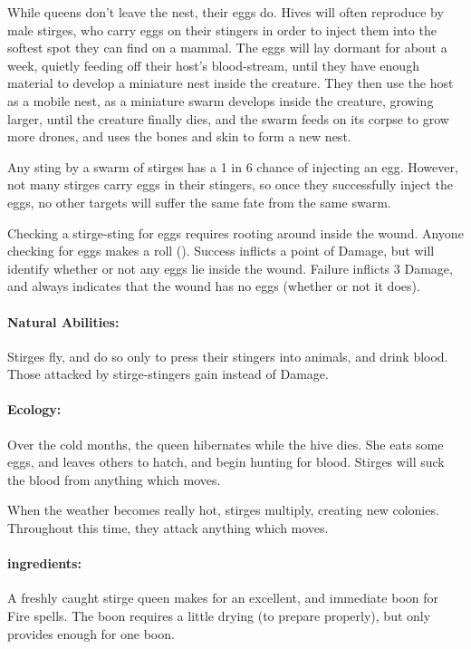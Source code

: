\begin{multicols}{2}
While queens don't leave the nest, their eggs do.
Hives will often reproduce by male stirges, who carry eggs on their stingers in order to inject them into the softest spot they can find on a mammal.
The eggs will lay dormant for about a week, quietly feeding off their host's blood-stream, until they have enough material to develop a miniature nest inside the creature.
They then use the host as a mobile nest, as a miniature swarm develops inside the creature, growing larger, until the creature finally dies, and the swarm feeds on its corpse to grow more drones, and uses the bones and skin to form a new nest.

Any sting by a swarm of stirges has a 1 in 6 chance of injecting an egg.
However, not many stirges carry eggs in their stingers, so once they successfully inject the eggs, no other targets will suffer the same fate from the same swarm.

Checking a stirge-sting for eggs requires rooting around inside the wound.
Anyone checking for eggs makes a  roll (\tn[12]).
Success inflicts a point of Damage, but will identify whether or not any eggs lie inside the wound.
Failure inflicts 3 Damage, and always indicates that the wound has no eggs (whether or not it does).

\paragraph{Natural Abilities:}
Stirges fly, and do so only to press their stingers into animals, and drink blood.
Those attacked by stirge-stingers gain  instead of Damage.

\paragraph{Ecology:}
Over the cold months, the queen hibernates while the hive dies.
She eats some eggs, and leaves others to hatch, and begin hunting for blood.
Stirges will suck the blood from anything which moves.

When the weather becomes really hot, stirges multiply, creating new colonies.
Throughout this time, they attack anything which moves.

\paragraph{\Glspl{ingredient}:}
A freshly caught stirge queen makes for an excellent, and immediate \gls{boon} for Fire spells.
The \gls{boon} requires a little drying (\tn[5] to prepare properly), but only provides enough for one \gls{boon}.


\end{multicols}
